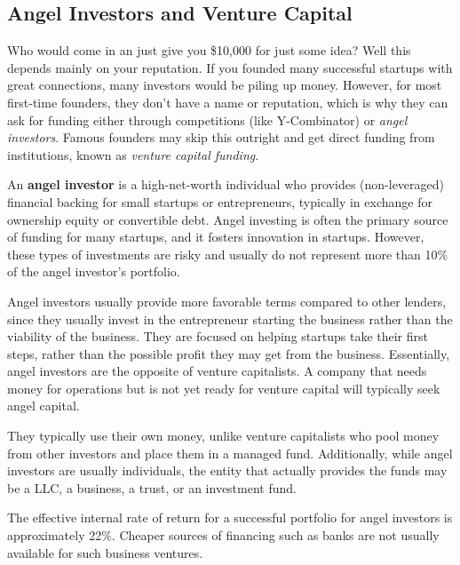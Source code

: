 \documentclass{article}
\begin{document}
  \subsection{Angel Investors and Venture Capital}

    Who would come in an just give you \$10,000 for just some idea? Well this depends mainly on your reputation. If you founded many successful startups with great connections, many investors would be piling up money. However, for most first-time founders, they don't have a name or reputation, which is why they can ask for funding either through competitions (like Y-Combinator) or \textit{angel investors}. Famous founders may skip this outright and get direct funding from institutions, known as \textit{venture capital funding}. 

    \begin{definition}
      An \textbf{angel investor} is a high-net-worth individual who provides (non-leveraged) financial backing for small startups or entrepreneurs, typically in exchange for ownership equity or convertible debt. Angel investing is often the primary source of funding for many startups, and it fosters innovation in startups. However, these types of investments are risky and usually do not represent more than 10\% of the angel investor's portfolio. 

      Angel investors usually provide more favorable terms compared to other lenders, since they usually invest in the entrepreneur starting the business rather than the viability of the business. They are focused on helping startups take their first steps, rather than the possible profit they may get from the business. Essentially, angel investors are the opposite of venture capitalists. A company that needs money for operations but is not yet ready for venture capital will typically seek angel capital. 

      They typically use their own money, unlike venture capitalists who pool money from other investors and place them in a managed fund. Additionally, while angel investors are usually individuals, the entity that actually provides the funds may be a LLC, a business, a trust, or an investment fund. 

      The effective internal rate of return for a successful portfolio for angel investors is approximately 22\%. Cheaper sources of financing such as banks are not usually available for such business ventures. 
    \end{definition}
\end{document}
